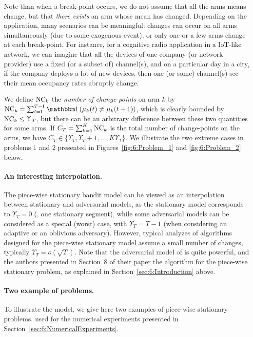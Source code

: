 Note than when a break-point occurs, we do not assume that all the arms means  change, but that \emph{there exists} an arm whose mean has changed.
Depending on the application, many scenarios can be meaningful: changes can occur on all arms simultaneously (due to some exogenous event), or only one or a few arms change at each break-point.
For instance, for a cognitive radio application in a IoT-like network, we can imagine that all the devices of one company (or network provider) use a fixed (or a subset of) channel(s), and on a particular day in a city, if the company deploys a lot of new devices, then one (or some) channel(s) see their mean occupancy rates abruptly change.

We define $\text{NC}_k$ the \emph{number of change-points} on arm $k$ by
$\NCk \eqdef \sum_{t=1}^{T-1} \indic\left(\mu_k(t) \neq \mu_k(t+1)\right)$,
which is clearly bounded by
$\text{NC}_k \leq \Upsilon_T$, but there can be an arbitrary difference between these two quantities for some arms.
If $C_T \overset{.}{=} \sum_{k=1}^K \text{NC}_k$ is the total number of change-points on the arms, we have $C_T \in \{ \Upsilon_T, \Upsilon_T + 1, \dots, K\Upsilon_T \}$.
We illustrate the two extreme cases in problems $1$ and $2$ presented in Figures~\ref{fig:6:Problem_1} and \ref{fig:6:Problem_2} below.


\paragraph{An interesting interpolation.}
%
The piece-wise stationary bandit model can be viewed as an interpolation between stationary and adversarial models, as the stationary model corresponds to $\Upsilon_T = 0$ (\ie, one stationary segment), while some adversarial models can be considered as a special (worst) case, with $\Upsilon_T = T-1$ (when considering an adaptive or an oblivious adversary).
However, typical analyzes of algorithms designed for the piece-wise stationary model assume a small number of changes, typically $\Upsilon_T = o(\sqrt{T})$.
Note that the adversarial model of \cite{Auer02NonStochastic} is quite powerful, and the authors presented in Section~8 of their paper the \ExpThreeS{} algorithm for the piece-wise stationary problem, as explained in Section~\ref{sec:6:Introduction} above.


\paragraph{Two example of problems.}\label{par:6:benchmark1}
%
To illustrate the model, we give here two examples of piece-wise stationary problems.
used for the numerical experiments presented in Section~\ref{sec:6:NumericalExperiments}.

